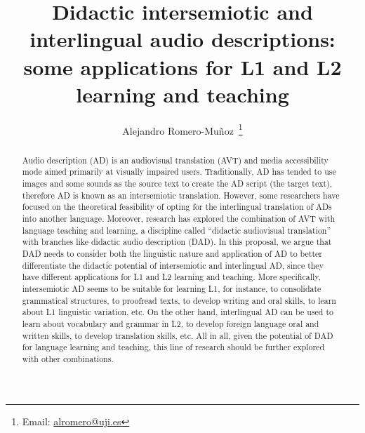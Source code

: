 \documentclass[english]{textolivre}
\title{Didactic intersemiotic and interlingual audio descriptions: some applications for L1 and L2 learning and teaching}
\author[1]{Alejandro Romero-Muñoz~\orcid{0000-0002-5869-0652}\thanks{Email: \href{mailto:alromero@uji.es}{alromero@uji.es}}}
\affil[1]{Universitat Jaume I, Castelló de la Plana, Castelló, Spain.}
\begin{document}
\maketitle

\begin{polyabstract}
\begin{abstract}
Audio description (AD) is an audiovisual translation (AVT) and media accessibility mode aimed primarily at visually impaired users. Traditionally, AD has tended to use images and some sounds as the source text to create the AD script (the target text), therefore AD is known as an intersemiotic translation. However, some researchers have focused on the theoretical feasibility of opting for the interlingual translation of ADs into another language. Moreover, research has explored the combination of AVT with language teaching and learning, a discipline called “didactic audiovisual translation” with branches like didactic audio description (DAD). In this proposal, we argue that DAD needs to consider both the linguistic nature and application of AD to better differentiate the didactic potential of intersemiotic and interlingual AD, since they have different applications for L1 and L2 learning and teaching. More specifically, intersemiotic AD seems to be suitable for learning L1, for instance, to consolidate grammatical structures, to proofread texts, to develop writing and oral skills, to learn about L1 linguistic variation, etc. On the other hand, interlingual AD can be used to learn about vocabulary and grammar in L2, to develop foreign language oral and written skills, to develop translation skills, etc. All in all, given the potential of DAD for language learning and teaching, this line of research should be further explored with other combinations.

\end{abstract}


\end{polyabstract}
\end{document}
